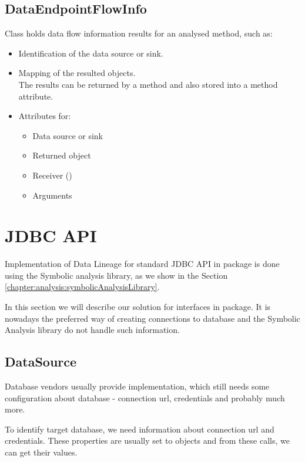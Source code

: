 \subsection{DataEndpointFlowInfo}

Class  holds data flow information results
for an analysed method, such as:
\begin{itemize}
  \item Identification of the data source or sink.
  \item Mapping of the resulted objects. \\
    The results can be returned by a method and also stored into a method attribute.
  \item Attributes for:
    \begin{itemize}
      \item Data source or sink
      \item Returned object
      \item Receiver ()
      \item Arguments
    \end{itemize}
\end{itemize}




\section{JDBC API \label{implementation:jdbc}}

Implementation of Data Lineage for standard JDBC API in  package
is done using the Symbolic analysis library, as we show in the Section \ref{chapter:analysis:symbolicAnalysisLibrary}.

In this section we will describe our solution for  interfaces in  package.
It is nowadays the preferred way of creating connections to database and the Symbolic Analysis
library do not handle such information.



\subsection{DataSource \label{implementation:dataSource}}

Database vendors usually provide  implementation, which still
needs some configuration about database - connection url, credentials and probably much more.

To identify target database, we need information about connection url and credentials. These properties
are usually set to  objects and from these calls, we can get
their values.

